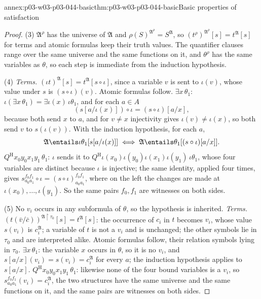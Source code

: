 \begin{annexitem}{annex:p03-w03-p03-044-basic}{thm:p03-w03-p03-044-basic}{Basic properties of satisfaction}
\begin{proof}
(3) \(\mathfrak A^\rho\) has the universe of \(\mathfrak A\) and
\(\rho(S)^{\mathfrak A^\rho}=S^{\mathfrak A}\), so
\((t^\rho)^{\mathfrak A^\rho}[s]=t^{\mathfrak A}[s]\) for terms and atomic
formulas keep their truth values.  The quantifier clauses range over the
same universe and the same functions on it, and \(\theta^\rho\) has the same
variables as \(\theta\), so each step is immediate from the induction
hypothesis.

(4) \emph{Terms.}  \((\iota t)^{\mathfrak A}[s]=t^{\mathfrak A}[s\circ\iota]\),
since a variable \(v\) is sent to \(\iota(v)\), whose value under \(s\) is
\((s\circ\iota)(v)\).  Atomic formulas follow.  \(\exists x\,\theta_1\):
\(\iota(\exists x\,\theta_1)=\exists\iota(x)\,\iota\theta_1\), and for each
\(a\in A\)
\[
 (s[a/\iota(x)])\circ\iota=(s\circ\iota)[a/x],
\]
because both send \(x\) to \(a\), and for \(v\neq x\) injectivity gives
\(\iota(v)\neq\iota(x)\), so both send \(v\) to \(s(\iota(v))\).  With the
induction hypothesis, for each \(a\),
\[
 \mathfrak A\entails\iota\theta_1[s[a/\iota(x)]]\iff
 \mathfrak A\entails\theta_1[(s\circ\iota)[a/x]].
\]
\(Q^{\mathrm H}x_0y_0x_1y_1\,\theta_1\): \(\iota\) sends it to
\(Q^{\mathrm H}\iota(x_0)\iota(y_0)\iota(x_1)\iota(y_1)\,\iota\theta_1\),
whose four variables are distinct because \(\iota\) is injective; the same
identity, applied four times, gives
\(s^{f_0f_1}_{a_0a_1}\circ\iota=(s\circ\iota)^{f_0f_1}_{a_0a_1}\), where on
the left the changes are made at \(\iota(x_0),\ldots,\iota(y_1)\).  So the
same pairs \(f_0,f_1\) are witnesses on both sides.

(5) No \(v_i\) occurs in any subformula of \(\theta\), so the hypothesis is
inherited.  \emph{Terms.}  \((t(\bar v/\bar c))^{\mathfrak A\restriction
\tau_0}[s]=t^{\mathfrak A}[s]\): the occurrence of \(c_i\) in \(t\) becomes
\(v_i\), whose value \(s(v_i)\) is \(c_i^{\mathfrak A}\); a variable of \(t\)
is not a \(v_i\) and is unchanged; the other symbols lie in \(\tau_0\) and
are interpreted alike.  Atomic formulas follow, their relation symbols lying
in \(\tau_0\).  \(\exists x\,\theta_1\): the variable \(x\) occurs in
\(\theta\), so it is no \(v_i\), and \(s[a/x](v_i)=s(v_i)=c_i^{\mathfrak A}\)
for every \(a\); the induction hypothesis applies to \(s[a/x]\).
\(Q^{\mathrm H}x_0y_0x_1y_1\,\theta_1\): likewise none of the four bound
variables is a \(v_i\), so \(s^{f_0f_1}_{a_0a_1}(v_i)=c_i^{\mathfrak A}\),
the two structures have the same universe and the same functions on it, and
the same pairs are witnesses on both sides.
\end{proof}
\end{annexitem}

